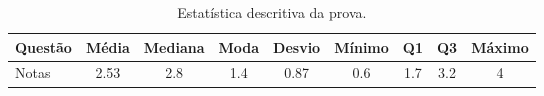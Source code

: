\begin{table}[H]
\centering
\renewcommand{\arraystretch}{1.1}
\caption{Estatística descritiva da prova.}
\begin{tabularx}{\textwidth}{Ycccccccc}
\toprule
Questão & Média & Mediana & Moda & Desvio & Mínimo & Q1 & Q3 & Máximo \\
\midrule
Notas & 2.53 & 2.8 & 1.4 & 0.87 & 0.6 & 1.7 & 3.2 & 4 \\
\bottomrule
\end{tabularx}
\end{table}
